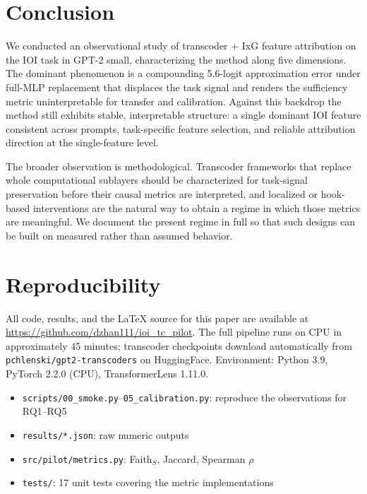 \documentclass{article}
\begin{document}
\section{Conclusion}

We conducted an observational study of transcoder + IxG feature attribution on
the IOI task in GPT-2 small, characterizing the method along five dimensions.
The dominant phenomenon is a compounding 5.6-logit approximation error under
full-MLP replacement that displaces the task signal and renders the sufficiency
metric uninterpretable for transfer and calibration. Against this backdrop the
method still exhibits stable, interpretable structure: a single dominant IOI
feature consistent across prompts, task-specific feature selection, and
reliable attribution direction at the single-feature level.

The broader observation is methodological. Transcoder frameworks that replace
whole computational sublayers should be characterized for task-signal
preservation before their causal metrics are interpreted, and localized or
hook-based interventions are the natural way to obtain a regime in which those
metrics are meaningful. We document the present regime in full so that such
designs can be built on measured rather than assumed behavior.

\section*{Reproducibility}

All code, results, and the LaTeX source for this paper are available at
\url{https://github.com/dzhan111/ioi_tc_pilot}. The full pipeline runs on CPU in
approximately 45 minutes; transcoder checkpoints download automatically from
\texttt{pchlenski/gpt2-transcoders} on HuggingFace. Environment: Python 3.9,
PyTorch 2.2.0 (CPU), TransformerLens 1.11.0.

\begin{itemize}
  \item \texttt{scripts/00\_smoke.py}--\texttt{05\_calibration.py}: reproduce
        the observations for RQ1--RQ5
  \item \texttt{results/*.json}: raw numeric outputs
  \item \texttt{src/pilot/metrics.py}: Faith$_S$, Jaccard, Spearman $\rho$
  \item \texttt{tests/}: 17 unit tests covering the metric implementations
\end{itemize}
\end{document}
